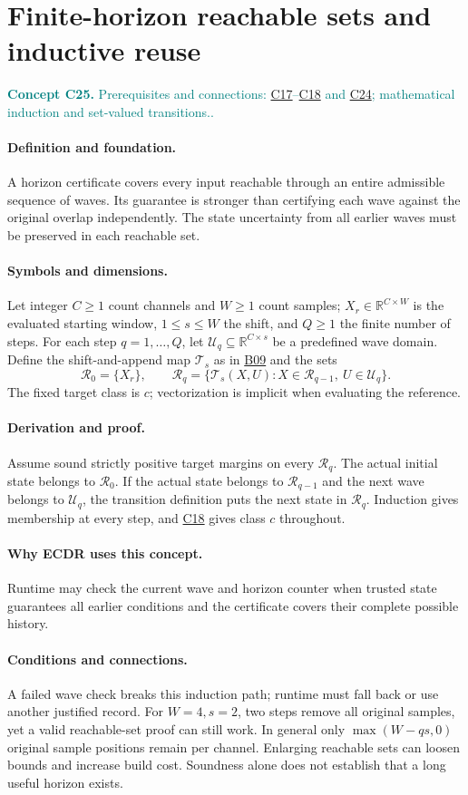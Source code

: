 \documentclass[11pt,a4paper]{article}
\newcommand{\R}{\mathbb R}
\newcommand{\conceptid}{Front matter}
\newcommand{\concept}[3]{\clearpage\renewcommand{\conceptid}{#1}%
\section{#2}\label{concept:#1}%
\textcolor{teal}{\textbf{Concept #1.} Prerequisites and connections: #3.}\par
\typeout{ECDR-CONCEPT-START #1 PAGE=\thepage}}
\begin{document}
\concept{C25}{Finite-horizon reachable sets and inductive reuse}{\hyperref[concept:C17]{C17}--\hyperref[concept:C18]{C18} and \hyperref[concept:C24]{C24}; mathematical induction and set-valued transitions.}
\paragraph{Definition and foundation.}
A horizon certificate covers every input reachable through an entire admissible sequence of waves. Its guarantee is stronger than certifying each wave against the original overlap independently. The state uncertainty from all earlier waves must be preserved in each reachable set.
\paragraph{Symbols and dimensions.}
Let integer $C\ge1$ count channels and $W\ge1$ count samples; $X_r\in\R^{C\times W}$ is the evaluated starting window, $1\le s\le W$ the shift, and $Q\ge1$ the finite number of steps. For each step $q=1,\ldots,Q$, let $\mathcal U_q\subseteq\R^{C\times s}$ be a predefined wave domain. Define the shift-and-append map $\mathcal T_s$ as in \hyperref[concept:B09]{B09} and the sets
\[
 \mathcal R_0=\{X_r\},\qquad
 \mathcal R_q=\{\mathcal T_s(X,U):X\in\mathcal R_{q-1},\ U\in\mathcal U_q\}.
\]
The fixed target class is $c$; vectorization is implicit when evaluating the reference.
\paragraph{Derivation and proof.}
Assume sound strictly positive target margins on every $\mathcal R_q$. The actual initial state belongs to $\mathcal R_0$. If the actual state belongs to $\mathcal R_{q-1}$ and the next wave belongs to $\mathcal U_q$, the transition definition puts the next state in $\mathcal R_q$. Induction gives membership at every step, and \hyperref[concept:C18]{C18} gives class $c$ throughout.
\paragraph{Why ECDR uses this concept.}
Runtime may check the current wave and horizon counter when trusted state guarantees all earlier conditions and the certificate covers their complete possible history.
\paragraph{Conditions and connections.}
A failed wave check breaks this induction path; runtime must fall back or use another justified record. For $W=4,s=2$, two steps remove all original samples, yet a valid reachable-set proof can still work. In general only $\max(W-qs,0)$ original sample positions remain per channel. Enlarging reachable sets can loosen bounds and increase build cost. Soundness alone does not establish that a long useful horizon exists.
\par\label{endconcept:C25}
\end{document}
